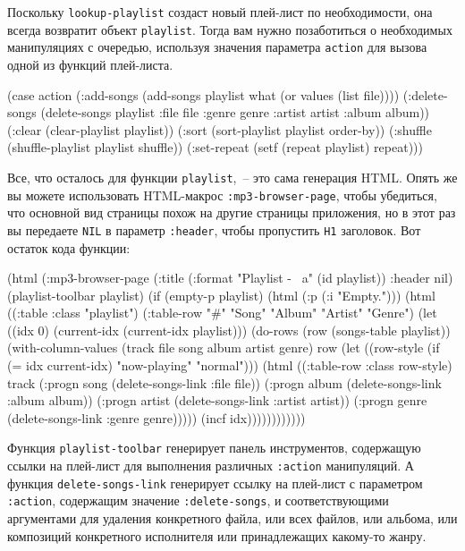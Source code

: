 Поскольку \lstinline{lookup-playlist} создаст новый плей-лист по необходимости, она всегда
возвратит объект \lstinline{playlist}. Тогда вам нужно позаботиться о необходимых манипуляциях
с очередью, используя значения параметра \lstinline{action} для вызова одной из функций
плей-листа.

\begin{myverb}
(case action
  (:add-songs      (add-songs playlist what (or values (list file))))
  (:delete-songs   (delete-songs 
                    playlist 
                    :file file :genre genre
                    :artist artist :album album))
  (:clear          (clear-playlist playlist))
  (:sort           (sort-playlist playlist order-by))
  (:shuffle        (shuffle-playlist playlist shuffle))
  (:set-repeat     (setf (repeat playlist) repeat)))
\end{myverb}

Все, что осталось для функции \lstinline{playlist},~-- это сама генерация HTML. Опять же вы можете
использовать HTML-макрос \lstinline{:mp3-browser-page}, чтобы убедиться, что основной вид
страницы похож на другие страницы приложения, но в этот раз вы передаете \lstinline{NIL} в
параметр \lstinline{:header}, чтобы пропустить \lstinline{H1} заголовок. Вот остаток кода функции:

\begin{myverb}
(html
 (:mp3-browser-page
  (:title (:format "Playlist - ~a" (id playlist)) :header nil)
  (playlist-toolbar playlist)
  (if (empty-p playlist)
    (html (:p (:i "Empty.")))
    (html 
      ((:table :class "playlist")
       (:table-row "#" "Song" "Album" "Artist" "Genre")
       (let ((idx 0)
             (current-idx (current-idx playlist)))
         (do-rows (row (songs-table playlist))
           (with-column-values (track file song album artist genre) row
             (let ((row-style (if (= idx current-idx) "now-playing" "normal")))
               (html
                 ((:table-row :class row-style)
                  track
                  (:progn song   (delete-songs-link :file file))
                  (:progn album  (delete-songs-link :album album))
                  (:progn artist (delete-songs-link :artist artist))
                  (:progn genre  (delete-songs-link :genre genre)))))
             (incf idx))))))))))))
\end{myverb}

Функция \lstinline{playlist-toolbar} генерирует панель инструментов, содержащую ссылки на
плей-лист для выполнения различных \lstinline{:action} манипуляций. А функция
\lstinline{delete-songs-link} генерирует ссылку на плей-лист с параметром \lstinline{:action},
содержащим значение \lstinline{:delete-songs}, и соответствующими аргументами для удаления
конкретного файла, или всех файлов, или альбома, или композиций конкретного исполнителя или
принадлежащих какому-то жанру.

